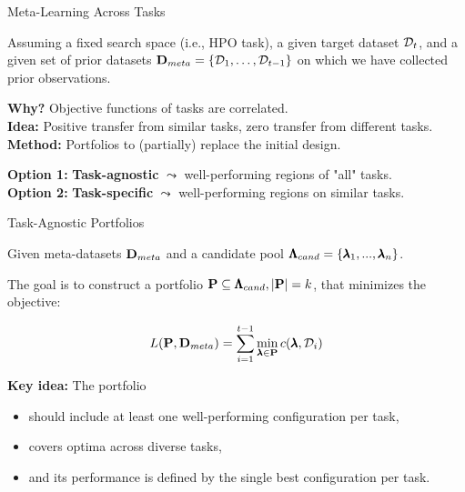 \documentclass[main]{subfiles}
\begin{document}
\begin{frame}[c]{Meta-Learning Across Tasks}

Assuming a fixed search space (i.e., HPO task), a given target dataset $\mathcal{D}_t$, and a given set of prior datasets $\mathbf{D}_{meta} = \{\mathcal{D}_1, \dots, \mathcal{D}_{t-1}\}$ on which we have collected prior observations.

\vspace{0.5cm}
\textbf{Why?} Objective functions of tasks are correlated. \\
\textbf{Idea:} Positive transfer from similar tasks, zero transfer from different tasks. \\
\textbf{Method:} Portfolios to (partially) replace the initial design.

\vspace{0.5cm}
\pause
\textbf{Option 1:} \textbf{Task-agnostic} $\leadsto$ well-performing regions of "all" tasks. \\
\textbf{Option 2:} \textbf{Task-specific} $\leadsto$ well-performing regions on similar tasks.

\end{frame}
\begin{frame}{Task-Agnostic Portfolios}

Given meta-datasets $\mathbf{D}_{meta}$ and a candidate pool $\pmb{\Lambda}_{cand} = \{\pmb{\lambda}_1, ..., \pmb{\lambda}_n\}$. 

The goal is to construct a portfolio $\mathbf{P} \subseteq \pmb{\Lambda}_{cand}, |\mathbf{P}| = k$, that minimizes the objective:

\begin{equation*}
L(\mathbf{P}, \mathbf{D}_{meta}) = \sum_{i=1}^{t-1} \min_{\pmb{\lambda} \in \mathbf{P}} c(\pmb{\lambda}, \mathcal{D}_i)
\end{equation*}

\pause
\textbf{Key idea:} The portfolio
\begin{itemize}
    \item should include at least one well-performing configuration per task,
    \item covers optima across diverse tasks,
    \item and its performance is defined by the single best configuration per task.
\end{itemize}

\end{frame}
\end{document}

